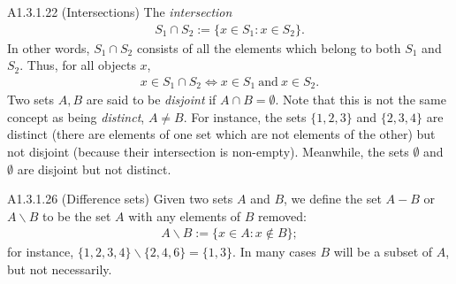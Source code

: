 \begin{definition}{A1.3.1.22}
    (Intersections) The \emph{intersection} \begin{align*}
        S_1\cap S_2 := \{x\in S_1:x\in S_2\}.
    \end{align*}
    In other words, $S_1\cap S_2$ consists of all the elements which belong to both $S_1$ and $S_2$. Thus, for all objects $x$,\begin{align*}
        x\in S_1\cap S_2 \iff x\in S_1~\text{and}~x\in S_2.
    \end{align*}
    Two sets $A,B$ are said to be \emph{disjoint} if $A\cap B=\emptyset$. Note that this is not the same concept as being \emph{distinct}, $A\neq B$. For instance, the sets $\{1,2,3\}$ and $\{2,3,4\}$ are distinct (there are elements of one set which are not elements of the other) but not disjoint (because their intersection is non-empty). Meanwhile, the sets $\emptyset$ and $\emptyset$ are disjoint but not distinct.
\end{definition}

\begin{definition}{A1.3.1.26}
    (Difference sets) Given two sets $A$ and $B$, we define the set $A-B$ or $A\backslash B$ to be the set $A$ with any elements of $B$ removed:\begin{align*}
        A\backslash B:=\{x\in A:x\notin B\};
    \end{align*}
    for instance, $\{1,2,3,4\}\backslash \{2,4,6\}=\{1,3\}$. In many cases $B$ will be a subset of $A$, but not necessarily.
\end{definition}



